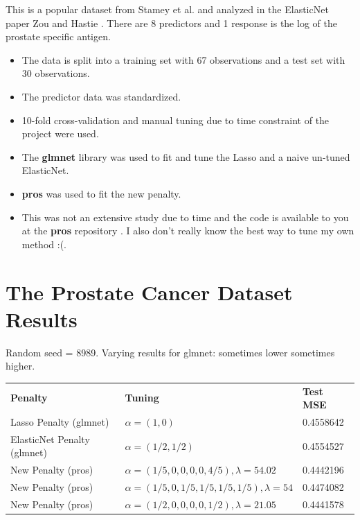 \documentclass[10pt, reqno]{article}
\numberwithin{equation}{section}
\begin{document}
This is a popular dataset from Stamey et al. \cite{prostate} and analyzed in the ElasticNet paper Zou and Hastie \cite{elasticnet}.
There are 8 predictors and 1 response is the log of the prostate specific antigen.

\begin{itemize}
\item The data is split into a training set with 67 observations and a test set with 30 observations.

\item The predictor data was standardized.

\item 10-fold cross-validation and manual tuning due to time constraint of the project were used.

\item The \textbf{glmnet} \cite{glmnet} library was used to fit and tune the Lasso and a naive un-tuned ElasticNet.

\item \textbf{pros} \cite{pros} was used to fit the new penalty.

\item This was not an extensive study due to time and the code is available to you at the \textbf{pros} repository \cite{pros}.
I also don't really know the best way to tune my own method :(.

\end{itemize}

\newpage
\section*{The Prostate Cancer Dataset Results}

Random seed = 8989. Varying results for glmnet: sometimes lower sometimes higher.

\begin{center}
\begingroup
\setlength{\tabcolsep}{6pt} %
\renewcommand{\arraystretch}{2} %
\begin{tabular}{ l l l}
\textbf{Penalty} & \textbf{Tuning} & \textbf{Test MSE} \\
Lasso Penalty (glmnet) & $\alpha = (1, 0)$ & 0.4558642 \\
ElasticNet Penalty (glmnet) & $\alpha = (1/2, 1/2)$  & 0.4554527   \\
New Penalty (pros) & $\alpha = (1/5, 0, 0, 0, 0, 4/5), \lambda = 54.02$ & 0.4442196 \\
New Penalty (pros) & $\alpha = (1/5, 0, 1/5, 1/5, 1/5, 1/5), \lambda = 54$ & 0.4474082 \\
New Penalty (pros) & $\alpha = (1/2, 0, 0, 0, 0, 1/2), \lambda = 21.05$ & 0.4441578 \\
\end{tabular}
\endgroup
\end{center}
\end{document}
